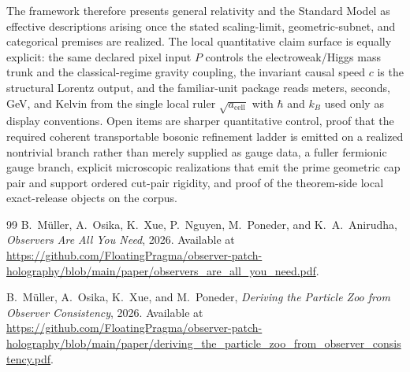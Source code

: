 \documentclass[11pt]{article}
\begin{document}
The framework therefore presents general relativity and the Standard Model as effective descriptions arising once the stated scaling-limit, geometric-subnet, and categorical premises are realized. The local quantitative claim surface is equally explicit: the same declared pixel input \(P\) controls the electroweak/Higgs mass trunk and the classical-regime gravity coupling, the invariant causal speed \(c\) is the structural Lorentz output, and the familiar-unit package reads meters, seconds, GeV, and Kelvin from the single local ruler \(\sqrt{a_{\mathrm{cell}}}\) with \(\hbar\) and \(k_B\) used only as display conventions. Open items are sharper quantitative control, proof that the required coherent transportable bosonic refinement ladder is emitted on a realized nontrivial branch rather than merely supplied as gauge data, a fuller fermionic gauge branch, explicit microscopic realizations that emit the prime geometric cap pair and support ordered cut-pair rigidity, and proof of the theorem-side local exact-release objects on the corpus.

\appendix


\begin{thebibliography}{99}
B.~M\"uller, A.~Osika, K.~Xue, P.~Nguyen, M.~Poneder, and K.~A.~Anirudha,
\emph{Observers Are All You Need},
2026.
Available at \url{https://github.com/FloatingPragma/observer-patch-holography/blob/main/paper/observers_are_all_you_need.pdf}.

B.~M\"uller, A.~Osika, K.~Xue, and M.~Poneder,
\emph{Deriving the Particle Zoo from Observer Consistency},
2026.
Available at \url{https://github.com/FloatingPragma/observer-patch-holography/blob/main/paper/deriving_the_particle_zoo_from_observer_consistency.pdf}.


\end{thebibliography}
\end{document}
